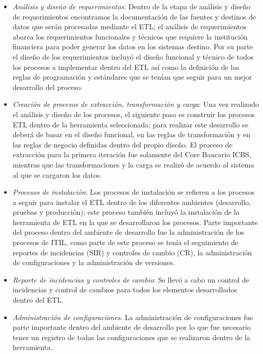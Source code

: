 \documentclass[a4paper,openright,12pt]{book}
\begin{document}
\begin{itemize}

\item \textit{Análisis y diseño de requerimientos}: Dentro de la etapa de
  análisis y diseño de requerimientos encontramos la documentación de las
  fuentes y destinos de datos que serán procesadas mediante el ETL; el análisis
  de requerimientos abarca los requerimientos funcionales y técnicos que
  requiere la institución financiera para poder generar los datos en los
  sistemas destino.  Por su parte el diseño de los requerimientos incluyó el
  diseño funcional y técnico de todos los procesos a implementar dentro del ETL
  así como la definición de las reglas de programación y estándares que se
  tenían que seguir para un mejor desarrollo del proceso.

\item \textit{Creación de procesos de extracción, transformación y carga}: Una
  vez realizado el análisis y diseño de los procesos, el siguiente paso es
  construir los procesos ETL dentro de la herramienta seleccionada; para
  realizar este desarrollo se deberá de basar en el diseño funcional, en las
  reglas de transformación y en las reglas de negocio definidas dentro del
  propio diseño. El proceso de extracción para la primera iteración fue
  solamente del Core Bancario ICBS, mientras que las transformaciones y la carga
  se realizó de acuerdo al sistema al que se cargaron los datos.

\item \textit{Procesos de instalación}: Los procesos de instalación se refieren
  a los procesos a seguir para instalar el ETL dentro de los diferentes
  ambientes (desarrollo, pruebas y producción); este proceso también incluyó la
  instalación de la herramienta de ETL en la que se desarrollaron los procesos.
  Parte importante del proceso dentro del ambiente de desarrollo fue la
  administración de los procesos de ITIL, como parte de este proceso se tenía el
  seguimiento de reportes de incidencias (SIR) y controles de cambio (CR), la
  administración de configuraciones y la administración de versiones.

\item \textit{Reporte de incidencias y controles de cambio}: Se llevó a cabo un
  control de incidencias y control de cambios para todos los elementos
  desarrollados dentro del ETL.

\item \textit{Administración de configuraciones}. La administración de
  configuraciones fue parte importante dentro del ambiente de desarrollo por lo
  que fue necesario tener un registro de todas las configuraciones que se
  realizaron dentro de la herramienta.


\end{itemize}
\end{document}
